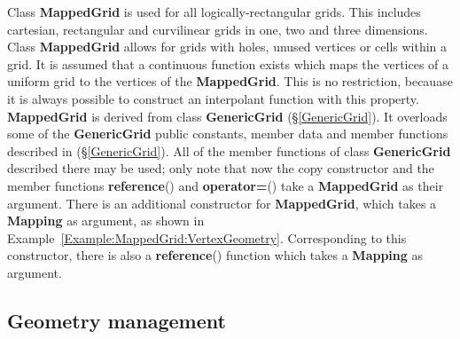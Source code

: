 \documentclass{article}
\begin{document}
Class \textbf{MappedGrid} is used for all logically-rectangular grids.
This includes cartesian, rectangular and curvilinear grids in one, two
and three dimensions.  Class \textbf{MappedGrid} allows for grids with
holes, unused vertices or cells within a grid.  It is assumed that a
continuous function exists which maps the vertices of a uniform grid to the
vertices of the \textbf{MappedGrid}.  This is no restriction, becauase
it is always possible to construct an interpolant function with this
property.  \textbf{MappedGrid} is derived from class
\textbf{GenericGrid} (\S\ref{GenericGrid}).
It overloads some of the \textbf{GenericGrid} public constants, member
data and member functions described in (\S\ref{GenericGrid}).  All of the
member functions of class \textbf{GenericGrid} described there may be
used; only note that now the copy constructor and the member functions
\textbf{reference}() and \textbf{operator=}() take a
\textbf{MappedGrid} as their argument.  There is an additional
constructor for \textbf{MappedGrid}, which takes a \textbf{Mapping}
as argument, as shown in
Example~\ref{Example:MappedGrid:VertexGeometry}.
Corresponding to this constructor, there is also a \textbf{reference}()
function which takes a \textbf{Mapping} as argument.


\subsection{Geometry management}
\label{MappedGrid:Geometry}
\end{document}
